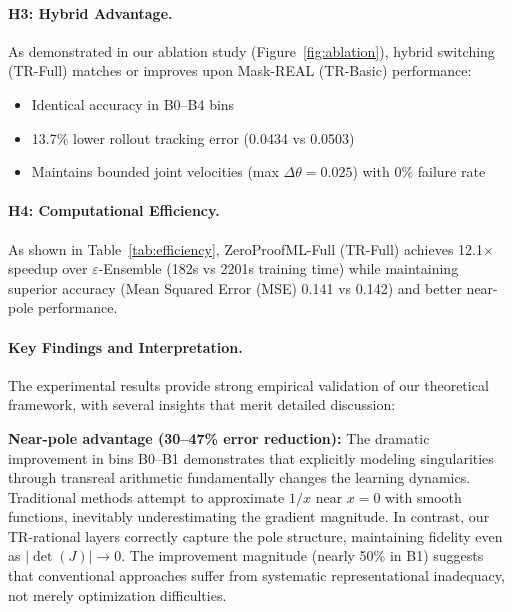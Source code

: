 \documentclass[twoside,11pt]{article}
\begin{document}
\paragraph{H3: Hybrid Advantage.}
As demonstrated in our ablation study (Figure~\ref{fig:ablation}), hybrid switching (TR-Full) matches or improves upon Mask-REAL (TR-Basic) performance:
\begin{itemize}
\item Identical accuracy in B0--B4 bins  
\item 13.7\% lower rollout tracking error (0.0434 vs 0.0503)
\item Maintains bounded joint velocities (max $\Delta\theta = 0.025$) with 0\% failure rate
\end{itemize}


\paragraph{H4: Computational Efficiency.}
As shown in Table~\ref{tab:efficiency}, ZeroProofML-Full (TR-Full) achieves 12.1$\times$ speedup over $\varepsilon$-Ensemble (182s vs 2201s training time) while maintaining superior accuracy (Mean Squared Error (MSE) 0.141 vs 0.142) and better near-pole performance.


\paragraph{Key Findings and Interpretation.}
The experimental results provide strong empirical validation of our theoretical framework, with several insights that merit detailed discussion:

\textbf{Near-pole advantage (30--47\% error reduction):} The dramatic improvement in bins B0--B1 demonstrates that explicitly modeling singularities through transreal arithmetic fundamentally changes the learning dynamics. Traditional methods attempt to approximate $1/x$ near $x=0$ with smooth functions, inevitably underestimating the gradient magnitude. In contrast, our TR-rational layers correctly capture the pole structure, maintaining fidelity even as $|\det(J)| \to 0$. The improvement magnitude (nearly 50\% in B1) suggests that conventional approaches suffer from systematic representational inadequacy, not merely optimization difficulties.
\end{document}
